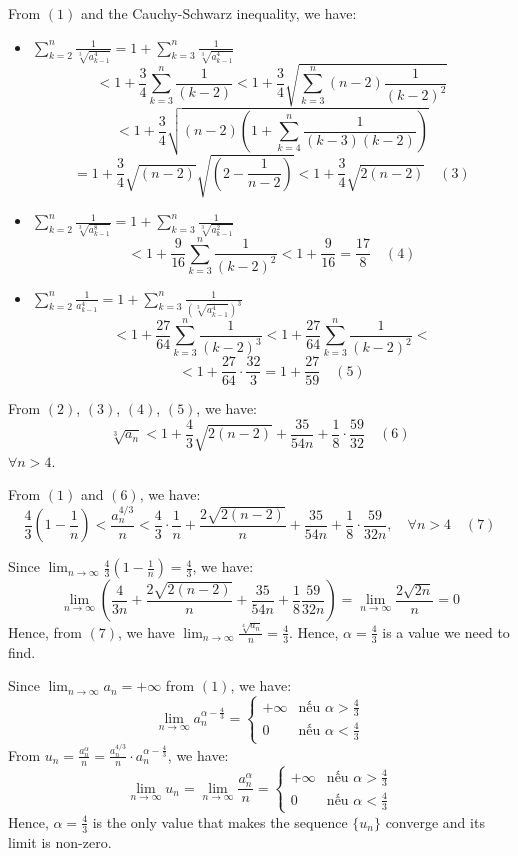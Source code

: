 \documentclass{article}
\begin{document}
From $(1)$ and the Cauchy-Schwarz inequality, we have:
\begin{itemize}
    \item $ \sum_{k=2}^{n} \frac{1}{\sqrt[3]{a_{k-1}^4}} = 1 + \sum_{k=3}^{n} \frac{1}{\sqrt[3]{a_{k-1}^4}} $
    $$ < 1 + \frac{3}{4}\sum_{k=3}^{n} \frac{1}{(k-2)} < 1 + \frac{3}{4}  \sqrt{\sum_{k=3}^{n} (n-2) \frac{1}{(k-2)^2}} $$
    $$ < 1 + \frac{3}{4} \sqrt{(n-2)(1 + \sum_{k=4}^{n} \frac{1}{(k-3)(k-2)})} $$
    $$ = 1 + \frac{3}{4} \sqrt{(n-2)} \sqrt{(2 - \frac{1}{n-2})} < 1 + \frac{3}{4} \sqrt{2(n-2)} \quad (3) $$

    \item $ \sum_{k=2}^{n} \frac{1}{\sqrt[3]{a_{k-1}^8}} = 1 + \sum_{k=3}^{n} \frac{1}{\sqrt[3]{a_{k-1}^2}} $
    $$ < 1 + \frac{9}{16} \sum_{k=3}^{n} \frac{1}{(k-2)^2} < 1 + \frac{9}{16} = \frac{17}{8} \quad (4) $$

    \item $ \sum_{k=2}^{n} \frac{1}{a_{k-1}^4} = 1 + \sum_{k=3}^{n} \frac{1}{(\sqrt[3]{a_{k-1}^4})^3} $
    $$ < 1 + \frac{27}{64} \sum_{k=3}^{n} \frac{1}{(k-2)^3} < 1 + \frac{27}{64} \sum_{k=3}^{n} \frac{1}{(k-2)^2} < $$
    $$ < 1 + \frac{27}{64} \cdot \frac{32}{3} = 1 + \frac{27}{59} \quad (5) $$
\end{itemize}

From $(2)$, $(3)$, $(4)$, $(5)$, we have:
$$ \sqrt[3]{a_n} < 1 + \frac{4}{3} \sqrt{2(n-2)} + \frac{35}{54n} + \frac{1}{8} \cdot \frac{59}{32} \quad (6) $$
$\forall n > 4$.

From $(1)$ and $(6)$, we have:
$$ \frac{4}{3} \left(1 - \frac{1}{n}\right) < \frac{a_n^{4/3}}{n} < \frac{4}{3} \cdot \frac{1}{n} + \frac{2\sqrt{2(n-2)}}{n} + \frac{35}{54n} + \frac{1}{8} \cdot \frac{59}{32n}, \quad \forall n > 4 \quad (7) $$

Since $\lim_{n \to \infty} \frac{4}{3} \left(1 - \frac{1}{n}\right) = \frac{4}{3}$, we have:
$$ \lim_{n \to \infty} \left(\frac{4}{3n} + \frac{2\sqrt{2(n-2)}}{n} + \frac{35}{54n} + \frac{1}{8} \frac{59}{32n}\right) = \lim_{n \to \infty} \frac{2\sqrt{2n}}{n} = 0 $$
Hence, from $(7)$, we have $\lim_{n \to \infty} \frac{\sqrt[4]{a_n}}{n} = \frac{4}{3}$.
Hence, $\alpha = \frac{4}{3}$ is a value we need to find.



Since $\lim_{n \to \infty} a_n = +\infty$ from $(1)$, we have:
$$ \lim_{n \to \infty} a_n^{\alpha - \frac{4}{3}} = \begin{cases} +\infty & \text{nếu } \alpha > \frac{4}{3} \\ 0 & \text{nếu } \alpha < \frac{4}{3} \end{cases} $$
From $u_n = \frac{a_n^\alpha}{n} = \frac{a_n^{4/3}}{n} \cdot a_n^{\alpha - \frac{4}{3}}$, we have:
$$ \lim_{n \to \infty} u_n = \lim_{n \to \infty} \frac{a_n^\alpha}{n} = \begin{cases} +\infty & \text{nếu } \alpha > \frac{4}{3} \\ 0 & \text{nếu } \alpha < \frac{4}{3} \end{cases} $$
Hence, $\alpha = \frac{4}{3}$ is the only value that makes the sequence $\{u_n\}$ converge and its limit is non-zero.
\end{document}
